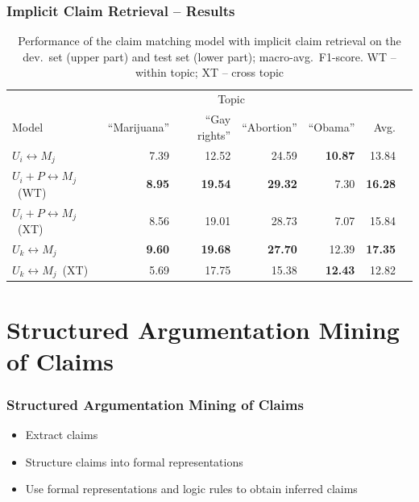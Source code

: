 \documentclass{beamer}
\begin{document}
\begin{frame}

	\frametitle{Implicit Claim Retrieval -- Results}

\begin{table}
\begin{center}
{\scriptsize
\setlength{\tabcolsep}{4.8pt}
\begin{tabular}{lrrrrrr}
\toprule
&\multicolumn{4}{c}{Topic}\\
\cmidrule(lr){2-5}
Model & ``Marijuana'' & ``Gay rights''  & ``Abortion'' & ``Obama'' & Avg. \\
\midrule
$U_i \leftrightarrow M_j$ & 7.39          & 12.52        & 24.59       & {\bf 10.87} & 13.84 \\
$U_i + P \leftrightarrow M_j$\ (WT)     & {\bf 8.95}    & {\bf 19.54}  & {\bf 29.32} & 7.30        & {\bf 16.28} \\
$U_i + P \leftrightarrow M_j$ \ (XT)   & 8.56          & 19.01        & 28.73       & 7.07        & 15.84 \\
\midrule
$U_k \leftrightarrow M_j$            & {\bf 9.60}   & {\bf 19.68}   & {\bf 27.70} & 12.39       & {\bf 17.35} \\
$U_k \leftrightarrow M_j$\ (XT)  & 5.69         &  17.75        & 15.38       & {\bf 12.43} & 12.82 \\
\bottomrule
\end{tabular}}
\caption{Performance of the claim matching model with implicit claim retrieval on the
dev.~set (upper part) and test set (lower part); macro-avg.~F1-score. WT -- within topic; XT -- cross topic}
\label{tab:argpremise_retrieval}
\end{center}
\end{table}
\end{frame}

\section{Structured Argumentation Mining of Claims}

\begin{frame}
	\frametitle{Structured Argumentation Mining of Claims}

	\begin{itemize}
		\item Extract claims 
		\item Structure claims into formal representations
		\item Use formal representations and logic rules to obtain inferred claims
	\end{itemize}

\end{frame}
\end{document}
